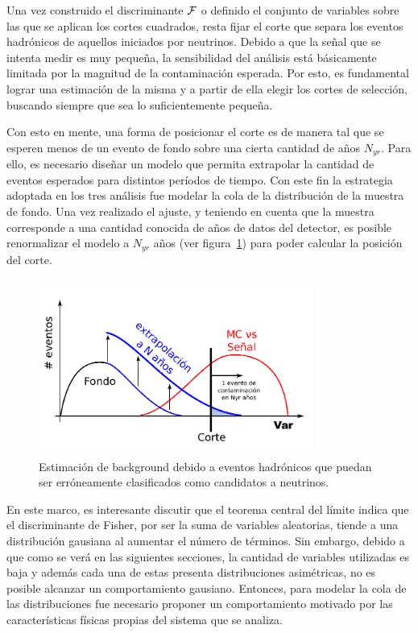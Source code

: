 	Una vez construido el discriminante ${\cal F}$ o definido el conjunto de variables sobre las que se aplican los cortes cuadrados, resta fijar el corte que separa los eventos hadrónicos de aquellos iniciados por neutrinos.
	Debido a que la señal que se intenta medir es muy pequeña, la sensibilidad del análisis está básicamente limitada por la magnitud de la contaminación esperada.
	Por esto, es fundamental lograr una estimación de la misma y a partir de ella elegir los cortes de selección, buscando siempre que sea lo suficientemente pequeña.
	
	Con esto en mente, una forma de posicionar el corte es de manera tal que se esperen menos de un evento de fondo sobre una cierta cantidad de años $N_{yr}$.
	Para ello, es necesario diseñar un modelo que permita extrapolar la cantidad de eventos esperados para distintos períodos de tiempo.
	Con este fin la estrategia adoptada en los tres análisis fue modelar la cola de la distribución de la muestra de fondo.
	Una vez realizado el ajuste, y teniendo en cuenta que la muestra corresponde a una cantidad conocida de años de datos del detector, es posible renormalizar el modelo a $N_{yr}$ años (ver figura~\ref{fig:estimaBackground}) para poder calcular la posición del corte.
	\begin{figure}[ht]
	\begin{center}
	\includegraphics[width=0.8\textwidth]{fig/seleccionAuger/estimaBackground.pdf}
	\caption{Estimación de background debido a eventos hadrónicos que puedan ser erróneamente clasificados como candidatos a neutrinos.}
	\label{fig:estimaBackground}
	\end{center}
	\end{figure}
	
	En este marco, es interesante discutir que el teorema central del límite indica que el discriminante de Fisher, por ser la suma de variables aleatorias, tiende a una distribución gausiana al aumentar el número de términos.
	Sin embargo, debido a que como se verá en las siguientes secciones, la cantidad de variables utilizadas es baja y además cada una de estas presenta distribuciones asimétricas, no es posible alcanzar un comportamiento gausiano.
	Entonces, para modelar la cola de las distribuciones fue necesario proponer un comportamiento motivado por las características físicas propias del sistema que se analiza.
	
